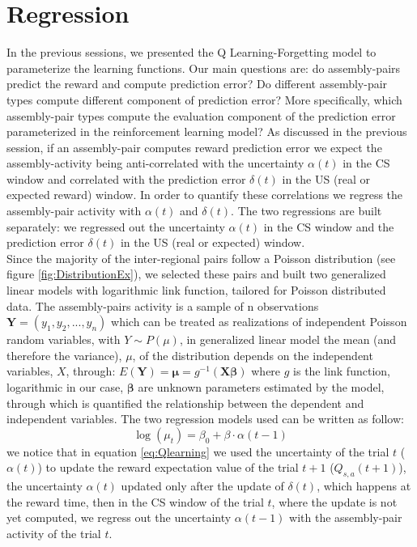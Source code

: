 \section{Regression}
\label{sec:Regression}
In the previous sessions, we presented the Q Learning-Forgetting model to parameterize the learning functions. Our main questions are: do assembly-pairs predict the reward and compute prediction error? Do different assembly-pair types compute different component of prediction error? More specifically, which assembly-pair types compute the evaluation component of the prediction error parameterized in the reinforcement learning model? As discussed in the previous session, if an assembly-pair computes reward prediction error we expect the assembly-activity being anti-correlated with the uncertainty $\alpha(t)$ in the CS window and correlated with the prediction error $\delta(t)$ in the US (real or expected reward) window. In order to quantify these correlations we regress the assembly-pair activity with $\alpha (t)$ and $\delta (t)$. The two regressions are built separately: we regressed out the uncertainty $\alpha(t)$ in the CS window and the prediction error $\delta(t)$ in the US (real or expected) window.\\Since the majority of the inter-regional pairs follow a Poisson distribution (see figure \ref{fig:DistributionEx}), we selected these pairs and built two generalized linear models with logarithmic link function, tailored for Poisson distributed data.
The assembly-pairs activity is a sample of n observations $\mathbf{Y}=(y_1, y_2,..., y_n)$ which can be treated as realizations of independent Poisson random variables, with $Y\sim P(\mu)$, in generalized linear model the mean (and therefore the variance), $\mu$, of the distribution depends on the independent variables, $X$, through:
$E (\mathbf {Y} )={\boldsymbol {\mu }}=g^{-1}(\mathbf {X} {\boldsymbol {\beta }})$ where $g$ is the link function, logarithmic in our case, $\boldsymbol{\beta}$ are unknown parameters estimated by the model, through which is quantified the relationship between the dependent and independent variables. The two regression models used can be written as follow:
\begin{equation}
    \log(\mu_t)=\beta_0+\beta\cdot\alpha(t-1)
    \label{eq:regrAlpha}
\end{equation}
we notice that in equation \ref{eq:Qlearning} we used the uncertainty of the trial $t$ ($\alpha(t)$) to update the reward expectation value of the trial $t+1$ ($Q_{s,a}(t+1)$), the uncertainty $\alpha(t)$ updated only after the update of $\delta(t)$, which happens at the reward time, then in the CS window of the trial $t$, where the update is not yet computed, we regress out the uncertainty $\alpha(t-1)$ with the assembly-pair activity of the trial $t$.
